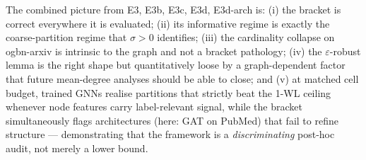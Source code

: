\documentclass[10pt]{article}
\theoremstyle{definition}
\theoremstyle{remark}
\begin{document}
The combined picture from E3, E3b, E3c, E3d, E3d-arch is: (i)
the bracket is correct everywhere it is evaluated; (ii) its
informative regime is exactly the coarse-partition regime that
$\sigma > 0$ identifies; (iii) the cardinality collapse on
ogbn-arxiv is intrinsic to the graph and not a bracket
pathology; (iv) the $\varepsilon$-robust lemma is the right
shape but quantitatively loose by a graph-dependent factor that
future mean-degree analyses should be able to close; and
(v) at matched cell budget, trained GNNs realise partitions that
strictly beat the 1-WL ceiling whenever node features carry
label-relevant signal, while the bracket simultaneously flags
architectures (here: GAT on PubMed) that fail to refine
structure --- demonstrating that the framework is a
\emph{discriminating} post-hoc audit, not merely a lower bound.
\end{document}
